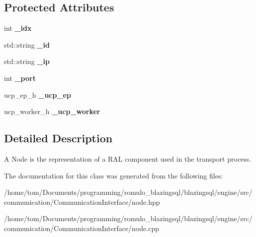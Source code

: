 \subsection*{Protected Attributes}
\begin{DoxyCompactItemize}
\item 
\mbox{\label{classcomm_1_1node_a119f38ac7c612b00e8defd385634e0bc}} 
int {\bfseries \+\_\+idx}
\item 
\mbox{\label{classcomm_1_1node_ae027c6b4895baf338bc6d7dfd9028564}} 
std\+::string {\bfseries \+\_\+id}
\item 
\mbox{\label{classcomm_1_1node_a0cb39ff296e4ce1849246e0768dd77c9}} 
std\+::string {\bfseries \+\_\+ip}
\item 
\mbox{\label{classcomm_1_1node_a9bdabd73ddf863beae2342bb95058368}} 
int {\bfseries \+\_\+port}
\item 
\mbox{\label{classcomm_1_1node_abe67a5273290657a1d7f2a3ec47daeb8}} 
ucp\+\_\+ep\+\_\+h {\bfseries \+\_\+ucp\+\_\+ep}
\item 
\mbox{\label{classcomm_1_1node_a7913c12e56fc9cbab2413c533c5615ef}} 
ucp\+\_\+worker\+\_\+h {\bfseries \+\_\+ucp\+\_\+worker}
\end{DoxyCompactItemize}


\subsection{Detailed Description}
A Node is the representation of a R\+AL component used in the transport process. 

The documentation for this class was generated from the following files\+:\begin{DoxyCompactItemize}
\item 
/home/tom/\+Documents/programming/romulo\+\_\+blazingsql/blazingsql/engine/src/communication/\+Communication\+Interface/node.\+hpp\item 
/home/tom/\+Documents/programming/romulo\+\_\+blazingsql/blazingsql/engine/src/communication/\+Communication\+Interface/node.\+cpp\end{DoxyCompactItemize}
